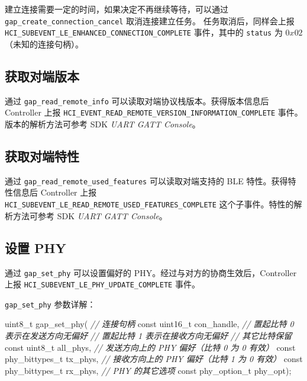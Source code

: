 \documentclass[
  12pt,
]{book}
\newenvironment{Shaded}{\begin{snugshade}}{\end{snugshade}}
\newcommand{\CommentTok}[1]{\textcolor[rgb]{0.56,0.35,0.01}{\textit{#1}}}
\newcommand{\DataTypeTok}[1]{\textcolor[rgb]{0.13,0.29,0.53}{#1}}
\newcommand{\NormalTok}[1]{#1}
\begin{document}
建立连接需要一定的时间，如果决定不再继续等待，可以通过 \texttt{gap\_create\_connection\_cancel} 取消连接建立任务。
任务取消后，同样会上报 \texttt{HCI\_SUBEVENT\_LE\_ENHANCED\_CONNECTION\_COMPLETE} 事件，其中的 \texttt{status} 为 \(0x02\)
（未知的连接句柄）。

\hypertarget{ux83b7ux53d6ux5bf9ux7aefux7248ux672c}{%
\subsection{获取对端版本}\label{ux83b7ux53d6ux5bf9ux7aefux7248ux672c}}

通过 \texttt{gap\_read\_remote\_info} 可以读取对端协议栈版本。获得版本信息后 Controller 上报 \texttt{HCI\_EVENT\_READ\_REMOTE\_VERSION\_INFORMATION\_COMPLETE}
事件。版本的解析方法可参考 SDK \emph{UART GATT Console}。

\hypertarget{ux83b7ux53d6ux5bf9ux7aefux7279ux6027}{%
\subsection{获取对端特性}\label{ux83b7ux53d6ux5bf9ux7aefux7279ux6027}}

通过 \texttt{gap\_read\_remote\_used\_features} 可以读取对端支持的 BLE 特性。获得特性信息后 Controller 上报 \texttt{HCI\_SUBEVENT\_LE\_READ\_REMOTE\_USED\_FEATURES\_COMPLETE}
这个子事件。特性的解析方法可参考 SDK \emph{UART GATT Console}。

\hypertarget{ux8bbeux7f6e-phy}{%
\subsection{设置 PHY}\label{ux8bbeux7f6e-phy}}

通过 \texttt{gap\_set\_phy} 可以设置偏好的 PHY。经过与对方的协商生效后，Controller 上报 \texttt{HCI\_SUBEVENT\_LE\_PHY\_UPDATE\_COMPLETE} 事件。

\texttt{gap\_set\_phy} 参数详解：

\begin{Shaded}
\begin{Highlighting}[]
\DataTypeTok{uint8_t}\NormalTok{ gap_set_phy(}
  \CommentTok{// 连接句柄}
  \DataTypeTok{const} \DataTypeTok{uint16_t}\NormalTok{ con_handle,}
  \CommentTok{// 置起比特 0 表示在发送方向无偏好}
  \CommentTok{// 置起比特 1 表示在接收方向无偏好}
  \CommentTok{// 其它比特保留}
  \DataTypeTok{const} \DataTypeTok{uint8_t}\NormalTok{ all_phys,}
  \CommentTok{// 发送方向上的 PHY 偏好（比特 0 为 0 有效）}
  \DataTypeTok{const}\NormalTok{ phy_bittypes_t tx_phys,}
  \CommentTok{// 接收方向上的 PHY 偏好（比特 1 为 0 有效）}
  \DataTypeTok{const}\NormalTok{ phy_bittypes_t rx_phys,}
  \CommentTok{// PHY 的其它选项}
  \DataTypeTok{const}\NormalTok{ phy_option_t phy_opt);}
\end{Highlighting}
\end{Shaded}
\end{document}
